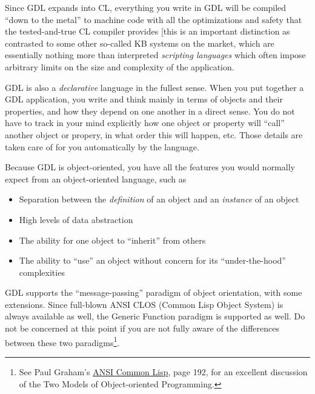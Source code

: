 \documentclass [11pt]{book}
\begin{document}
Since GDL expands into CL, everything you write in GDL will be
compiled ``down to the metal'' to machine code with all the
optimizations and safety that the tested-and-true CL compiler provides
[this is an important distinction as contrasted to some other
so-called KB systems on the market, which are essentially nothing more
than interpreted \emph{scripting languages} which often impose arbitrary limits on
the size and complexity of the application.

GDL is also a \emph{declarative} language in the fullest sense. When you put together a GDL application, you write and think mainly
in terms of objects and their properties, and how they depend on one another in a direct
sense. You do not have to track in your mind explicitly how one object or property will ``call''
another object or propery, in what order this will happen, etc. Those details are
taken care of for you automatically by the language. 

Because GDL is object-oriented, you have all the features you would normally expect
from an object-oriented language, such as 

\begin{itemize}

\item Separation between the \emph{definition} of an object and an \emph{instance} of an object

\item High levels of data abstraction

\item The ability for one object to ``inherit'' from others

\item The ability to ``use'' an object without concern for
	its ``under-the-hood'' complexities

\end{itemize}

GDL supports the ``message-passing'' paradigm of object
orientation, with some extensions. Since full-blown ANSI CLOS (Common
Lisp Object System) is always available as well, the Generic Function
paradigm is supported as well. Do not be concerned at this point if
you are not fully aware of the differences between these two
paradigms\footnote{See Paul Graham's 
\underline{ANSI Common Lisp}, page 192, for an excellent discussion of the Two Models 
of Object-oriented Programming.}.
\end{document}
